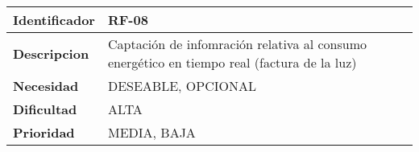 \begin{center}
    \begin{tabular}{|p{2.6cm}|p{12cm}|}
    \hline
    \textbf{Identificador} & RF-08\\
    \hline
    \textbf{Descripcion} & Captación de infomración relativa al consumo energético en tiempo real (factura de la luz)
    \\
    \hline
    \textbf{Necesidad} & DESEABLE, OPCIONAL\\
    \hline
    \textbf{Dificultad} & ALTA\\
    \hline
    \textbf{Prioridad} & MEDIA, BAJA\\
    \hline
    \end{tabular}
\end{center}
